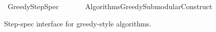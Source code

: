 %
\begin{isabellebody}%
%
%
\isadelimtheory
%
\endisadelimtheory
%
\isatagtheory
{}\isamarkupfalse%
\ Greedy{\isacharunderscore}{\kern0pt}Step{\isacharunderscore}{\kern0pt}Spec\isanewline
\ \ \isanewline
\ \ \ \ {\isachardoublequoteopen}{\isachardot}{\kern0pt}{\isachardot}{\kern0pt}{\isacharslash}{\kern0pt}Algorithms{\isacharslash}{\kern0pt}Greedy{\isacharunderscore}{\kern0pt}Submodular{\isacharunderscore}{\kern0pt}Construct{\isachardoublequoteclose}\isanewline
{}%
\endisatagtheory
{\isafoldtheory}%
%
\isadelimtheory
%
\endisadelimtheory
%
\begin{isamarkuptext}%
Step-spec interface for greedy-style algorithms.


\end{isamarkuptext}
\end{isabellebody}
